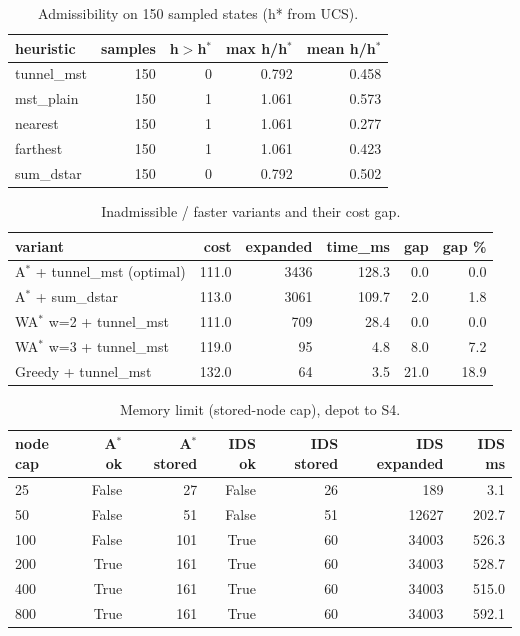 \begin{table}[t]
\centering
\footnotesize
\caption{Admissibility on 150 sampled states (h* from UCS).}
\label{tab:adm}
\setlength{\tabcolsep}{3pt}
\begin{tabular}{lrrrr}
\toprule
heuristic & samples & h$>$h$^*$ & max h/h$^*$ & mean h/h$^*$ \\
\midrule
tunnel\_mst & 150 & 0 & 0.792 & 0.458 \\
mst\_plain & 150 & 1 & 1.061 & 0.573 \\
nearest & 150 & 1 & 1.061 & 0.277 \\
farthest & 150 & 1 & 1.061 & 0.423 \\
sum\_dstar & 150 & 0 & 0.792 & 0.502 \\
\bottomrule
\end{tabular}
\end{table}

\begin{table}[t]
\centering
\footnotesize
\caption{Inadmissible / faster variants and their cost gap.}
\label{tab:inadm}
\setlength{\tabcolsep}{3pt}
\begin{tabular}{lrrrrr}
\toprule
variant & cost & expanded & time\_ms & gap & gap \% \\
\midrule
A$^*$ + tunnel\_mst (optimal) & 111.0 & 3436 & 128.3 & 0.0 & 0.0 \\
A$^*$ + sum\_dstar & 113.0 & 3061 & 109.7 & 2.0 & 1.8 \\
WA$^*$ w=2 + tunnel\_mst & 111.0 & 709 & 28.4 & 0.0 & 0.0 \\
WA$^*$ w=3 + tunnel\_mst & 119.0 & 95 & 4.8 & 8.0 & 7.2 \\
Greedy + tunnel\_mst & 132.0 & 64 & 3.5 & 21.0 & 18.9 \\
\bottomrule
\end{tabular}
\end{table}

\begin{table}[t]
\centering
\footnotesize
\caption{Memory limit (stored-node cap), depot to S4.}
\label{tab:mem}
\setlength{\tabcolsep}{3pt}
\begin{tabular}{lrrrrrr}
\toprule
node cap & A$^*$ ok & A$^*$ stored & IDS ok & IDS stored & IDS expanded & IDS ms \\
\midrule
25 & False & 27 & False & 26 & 189 & 3.1 \\
50 & False & 51 & False & 51 & 12627 & 202.7 \\
100 & False & 101 & True & 60 & 34003 & 526.3 \\
200 & True & 161 & True & 60 & 34003 & 528.7 \\
400 & True & 161 & True & 60 & 34003 & 515.0 \\
800 & True & 161 & True & 60 & 34003 & 592.1 \\
\bottomrule
\end{tabular}
\end{table}

